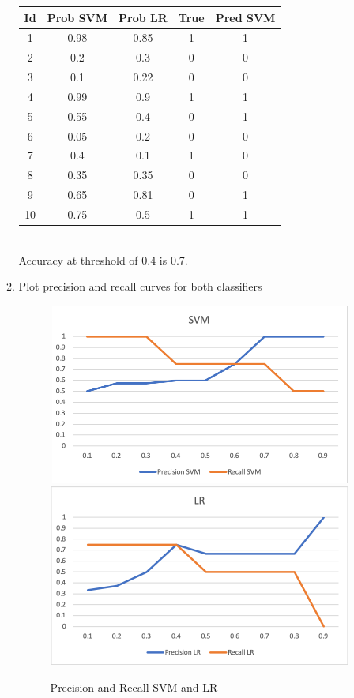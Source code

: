 \documentclass[a4paper, 11pt]{article}
\begin{document}
\begin{enumerate}
\begin{enumerate}
	\begin{tabular}{ c | c | c | c | c }
	Id & Prob SVM & Prob LR & True & Pred SVM \\
	\hline
	1 & 0.98 & 0.85 & 1 & 1 \\
	2 & 0.2 & 0.3 & 0 & 0 \\
	3 & 0.1 & 0.22 & 0 & 0 \\ 
	4 & 0.99 & 0.9 & 1 & 1 \\
	5 & 0.55 & 0.4 & 0 & 1 \\
	6 & 0.05 & 0.2 & 0 & 0 \\
	7 & 0.4 & 0.1 & 1 & 0 \\
	8 & 0.35 & 0.35 & 0 & 0 \\
	9 & 0.65 & 0.81 & 0 & 1 \\
	10 & 0.75 & 0.5 & 1 & 1 \\
	\hline
	\end{tabular}\\

Accuracy at threshold of 0.4 is 0.7.\\

	\item Plot precision and recall curves for both classifiers
	\begin{figure}[hbt!]
    	\centering
     	\caption{Precision and Recall SVM and LR}
     	\label{fig:examples}
     	\includegraphics[scale = 0.7]{pre_rec_SVM}
	\\
     	\includegraphics[scale = 0.7]{pre_rec_LR}
\end{figure}\\


\end{enumerate}
\end{enumerate}
\end{document}
